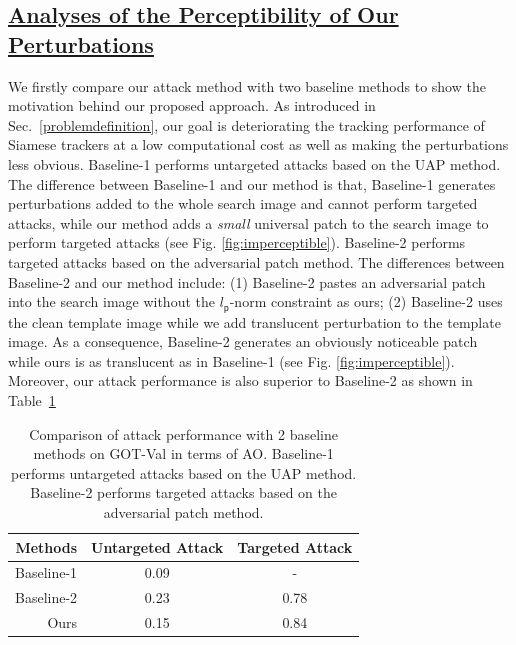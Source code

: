 \documentclass[journal]{IEEEtran}
\begin{document}
\subsection{\uline{Analyses of the Perceptibility of Our Perturbations}}

We firstly compare our attack method with two baseline methods to show the motivation behind our proposed approach. As introduced in Sec.~\ref{problemdefinition}, our goal is deteriorating the tracking performance of Siamese trackers at a low computational cost as well as making the perturbations less obvious.
Baseline-1 performs untargeted attacks based on the UAP \cite{UAP} method. The difference between Baseline-1 and our method is that, Baseline-1 generates perturbations added to the whole search image and cannot perform targeted attacks, while our method adds a \textit{small} universal patch to the search image to perform targeted attacks (see Fig. \ref{fig:imperceptible}).
Baseline-2 performs targeted attacks based on the adversarial patch \cite{patch} method. The differences between Baseline-2 and our method include: (1) Baseline-2 pastes an adversarial patch into the search image without the $l_{\mathsf{p}}\text{-norm}$ constraint as ours; 
(2) Baseline-2 uses the clean template image while we add translucent perturbation to the template image. As a consequence, Baseline-2 generates an obviously noticeable patch while ours is as translucent as in Baseline-1 (see Fig. \ref{fig:imperceptible}). Moreover, our attack performance is also superior to Baseline-2 as shown in Table~\ref{tab:imperceptible}
\begin{table}[t]
  \centering
  \caption{Comparison of attack performance with 2 baseline methods on GOT-Val in terms of AO. Baseline-1 performs untargeted attacks based on the UAP \cite{UAP} method. Baseline-2 performs targeted attacks based on the adversarial patch \cite{patch} method.}
  \begin{tabular}{@{}rcc@{}}
  \toprule
  Methods & Untargeted Attack & Targeted Attack \\ \midrule
  Baseline-1 \cite{UAP}  & 0.09          & -\\
  Baseline-2 \cite{patch}   & 0.23       & 0.78\\
  Ours & 0.15       & 0.84\\ \bottomrule
  \end{tabular}
  \label{tab:imperceptible}
\end{table}
  
\end{document}
